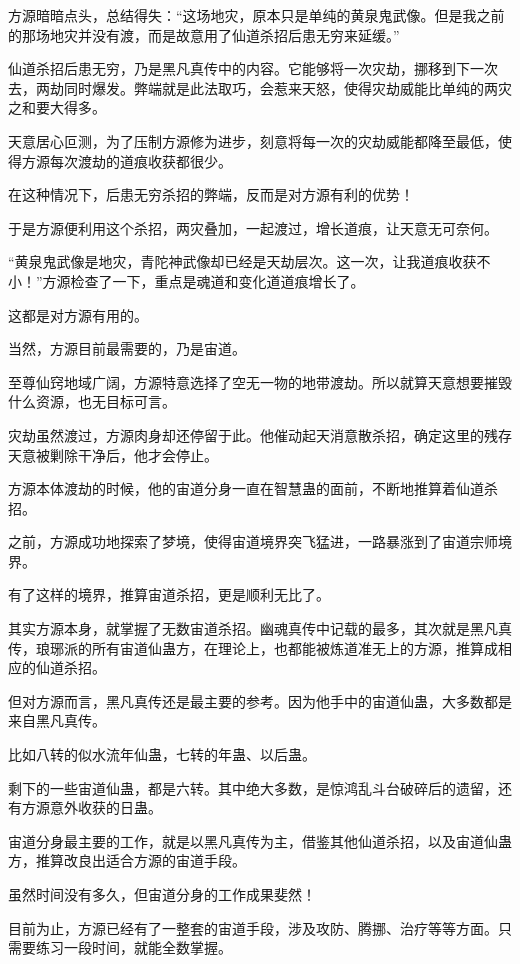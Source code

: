 \begin{this_body}
方源暗暗点头，总结得失：“这场地灾，原本只是单纯的黄泉鬼武像。但是我之前的那场地灾并没有渡，而是故意用了仙道杀招后患无穷来延缓。”

仙道杀招后患无穷，乃是黑凡真传中的内容。它能够将一次灾劫，挪移到下一次去，两劫同时爆发。弊端就是此法取巧，会惹来天怒，使得灾劫威能比单纯的两灾之和要大得多。

天意居心叵测，为了压制方源修为进步，刻意将每一次的灾劫威能都降至最低，使得方源每次渡劫的道痕收获都很少。

在这种情况下，后患无穷杀招的弊端，反而是对方源有利的优势！

于是方源便利用这个杀招，两灾叠加，一起渡过，增长道痕，让天意无可奈何。

“黄泉鬼武像是地灾，青陀神武像却已经是天劫层次。这一次，让我道痕收获不小！”方源检查了一下，重点是魂道和变化道道痕增长了。

这都是对方源有用的。

当然，方源目前最需要的，乃是宙道。

至尊仙窍地域广阔，方源特意选择了空无一物的地带渡劫。所以就算天意想要摧毁什么资源，也无目标可言。

灾劫虽然渡过，方源肉身却还停留于此。他催动起天消意散杀招，确定这里的残存天意被剿除干净后，他才会停止。

方源本体渡劫的时候，他的宙道分身一直在智慧蛊的面前，不断地推算着仙道杀招。

之前，方源成功地探索了梦境，使得宙道境界突飞猛进，一路暴涨到了宙道宗师境界。

有了这样的境界，推算宙道杀招，更是顺利无比了。

其实方源本身，就掌握了无数宙道杀招。幽魂真传中记载的最多，其次就是黑凡真传，琅琊派的所有宙道仙蛊方，在理论上，也都能被炼道准无上的方源，推算成相应的仙道杀招。

但对方源而言，黑凡真传还是最主要的参考。因为他手中的宙道仙蛊，大多数都是来自黑凡真传。

比如八转的似水流年仙蛊，七转的年蛊、以后蛊。

剩下的一些宙道仙蛊，都是六转。其中绝大多数，是惊鸿乱斗台破碎后的遗留，还有方源意外收获的日蛊。

宙道分身最主要的工作，就是以黑凡真传为主，借鉴其他仙道杀招，以及宙道仙蛊方，推算改良出适合方源的宙道手段。

虽然时间没有多久，但宙道分身的工作成果斐然！

目前为止，方源已经有了一整套的宙道手段，涉及攻防、腾挪、治疗等等方面。只需要练习一段时间，就能全数掌握。


\end{this_body}
